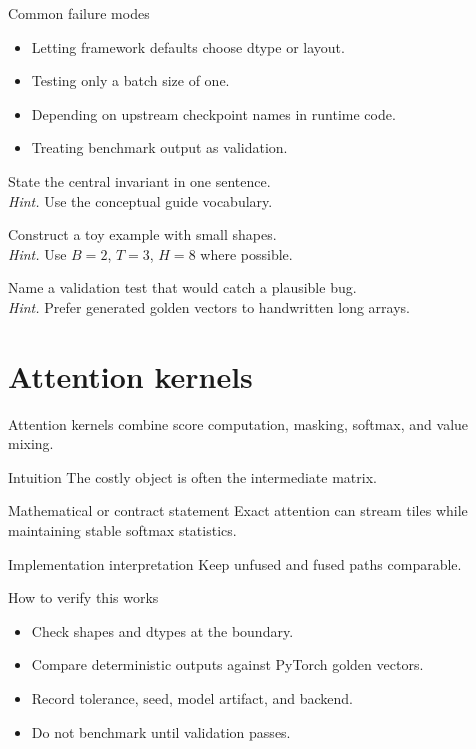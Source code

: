 \begin{warningbox}{Common failure modes}
\begin{itemize}
\item Letting framework defaults choose dtype or layout.
\item Testing only a batch size of one.
\item Depending on upstream checkpoint names in runtime code.
\item Treating benchmark output as validation.
\end{itemize}
\end{warningbox}

\begin{chapterexercises}
\item State the central invariant in one sentence.\\
\textit{Hint.} Use the conceptual guide vocabulary.
\item Construct a toy example with small shapes.\\
\textit{Hint.} Use $B=2$, $T=3$, $H=8$ where possible.
\item Name a validation test that would catch a plausible bug.\\
\textit{Hint.} Prefer generated golden vectors to handwritten long arrays.
\end{chapterexercises}

\chapter{Attention kernels}
\label{ch:attention-kernels}
Attention kernels combine score computation, masking, softmax, and value mixing. \citep{dao2022flashattention,dao2024flashattention2}



\begin{intuitionbox}{Intuition}
The costly object is often the intermediate matrix.
\end{intuitionbox}

\begin{definitionbox}{Mathematical or contract statement}
Exact attention can stream tiles while maintaining stable softmax statistics.
\end{definitionbox}

\begin{implementationbox}{Implementation interpretation}
Keep unfused and fused paths comparable.
\end{implementationbox}

\begin{verificationbox}{How to verify this works}
\begin{itemize}
\item Check shapes and dtypes at the boundary.
\item Compare deterministic outputs against PyTorch golden vectors.
\item Record tolerance, seed, model artifact, and backend.
\item Do not benchmark until validation passes.
\end{itemize}
\end{verificationbox}

